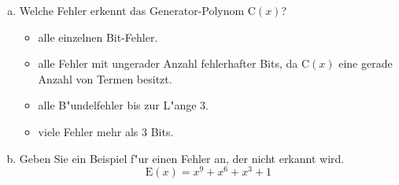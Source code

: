 \begin{enumerate}[(a)]
    \item Welche Fehler erkennt das Generator-Polynom $\text{C}(x)$?
        \begin{itemize}
            \item alle einzelnen Bit-Fehler.
            \item alle Fehler mit ungerader Anzahl fehlerhafter Bits, da
                $\text{C}(x)$ eine gerade Anzahl von Termen besitzt.
            \item alle B"undelfehler bis zur L"ange 3.
            \item viele Fehler mehr als 3 Bits.
        \end{itemize}

    \item Geben Sie ein Beispiel f"ur einen Fehler an, der nicht erkannt wird.
        \begin{equation*}
            \text{E}(x) = x^9 + x^6 + x^3 + 1
        \end{equation*}
\end{enumerate}
